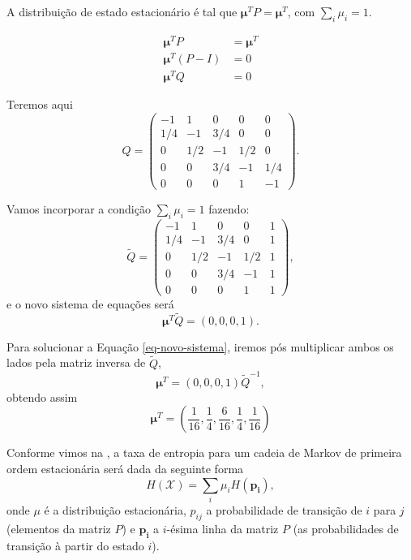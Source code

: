 \begin{example}
A distribuição de estado estacionário é tal que $\mathbf{\mu}^T P = \mathbf{\mu}^T$, com $\sum_i \mu_i = 1$.

\begin{subequations}
\begin{align}
\mathbf{\mu}^T P &= \mathbf{\mu}^T \\
\mathbf{\mu}^T (P-I) &= 0 \\
\mathbf{\mu}^T Q &= 0
\end{align}
\end{subequations}


Teremos aqui
\begin{equation}
Q = \begin{pmatrix}
-1  &  1  & 0   & 0   & 0   \\
1/4 & -1  & 3/4 & 0   & 0   \\
0   & 1/2 & -1  & 1/2 & 0   \\
0   & 0   & 3/4 & -1  & 1/4 \\
0   & 0   & 0   & 1   & -1
\end{pmatrix} .
\end{equation}

Vamos incorporar a condição $\sum_i \mu_i = 1$ fazendo:
\begin{equation}
\tilde{Q} = \begin{pmatrix}
-1  &  1  & 0   & 0   & 1 \\
1/4 & -1  & 3/4 & 0   & 1 \\
0   & 1/2 & -1  & 1/2 & 1 \\
0   & 0   & 3/4 & -1  & 1 \\
0   & 0   & 0   & 1   & 1
\end{pmatrix} ,
\end{equation}
e o novo sistema de equações será
\begin{equation}\label{eq-novo-sistema}
\mathbf{\mu}^T \tilde{Q} = (0, 0, 0, 1) .
\end{equation}

Para solucionar a Equação \ref{eq-novo-sistema}, iremos pós multiplicar ambos os lados
pela matriz inversa de $\tilde{Q}$,
\begin{equation}
\mathbf{\mu}^T = (0, 0, 0, 1) \tilde{Q}^{-1} ,
\end{equation}
obtendo assim
\begin{equation}
\mathbf{\mu}^T = \left( \frac{1}{16}, \frac{1}{4}, \frac{6}{16}, \frac{1}{4}, \frac{1}{16} \right)
\end{equation}

Conforme vimos na , a taxa de entropia para um
cadeia de Markov de primeira ordem estacionária será dada da seguinte forma
\begin{equation}
  H(\mathcal{X}) = \sum_i \mu_i H( \mathbf{p_i} ) ,
\end{equation}
onde $\mu$ é a distribuição estacionária,
$p_{ij}$ a probabilidade de transição de $i$ para $j$ (elementos da matriz $P$)
e $\mathbf{p_i}$ a $i$-ésima linha da matriz $P$ (as probabilidades de transição à partir
do estado $i$).


\end{example}
